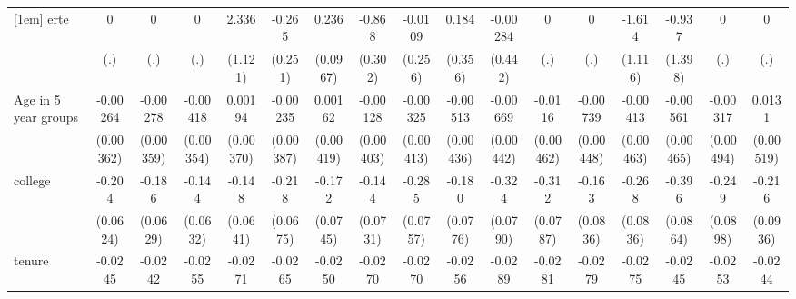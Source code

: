 {\begin{tabular}{l*{16}{c}}
[1em]
erte                &           0         &           0         &           0         &       2.336\sym{*}  &      -0.265         &       0.236\sym{*}  &      -0.868\sym{**} &     -0.0109         &       0.184         &    -0.00284         &           0         &           0         &      -1.614         &      -0.937         &           0         &           0         \\
                    &         (.)         &         (.)         &         (.)         &     (1.121)         &     (0.251)         &    (0.0967)         &     (0.302)         &     (0.256)         &     (0.356)         &     (0.442)         &         (.)         &         (.)         &     (1.116)         &     (1.398)         &         (.)         &         (.)         \\
[1em]
Age in 5 year groups&    -0.00264         &    -0.00278         &    -0.00418         &     0.00194         &    -0.00235         &     0.00162         &    -0.00128         &    -0.00325         &    -0.00513         &    -0.00669         &     -0.0116\sym{*}  &    -0.00739         &    -0.00413         &    -0.00561         &    -0.00317         &      0.0131\sym{*}  \\
                    &   (0.00362)         &   (0.00359)         &   (0.00354)         &   (0.00370)         &   (0.00387)         &   (0.00419)         &   (0.00403)         &   (0.00413)         &   (0.00436)         &   (0.00442)         &   (0.00462)         &   (0.00448)         &   (0.00463)         &   (0.00465)         &   (0.00494)         &   (0.00519)         \\
[1em]
college             &      -0.204\sym{**} &      -0.186\sym{**} &      -0.144\sym{*}  &      -0.148\sym{*}  &      -0.218\sym{**} &      -0.172\sym{*}  &      -0.144\sym{*}  &      -0.285\sym{***}&      -0.180\sym{*}  &      -0.324\sym{***}&      -0.312\sym{***}&      -0.163         &      -0.268\sym{**} &      -0.396\sym{***}&      -0.249\sym{**} &      -0.216\sym{*}  \\
                    &    (0.0624)         &    (0.0629)         &    (0.0632)         &    (0.0641)         &    (0.0675)         &    (0.0745)         &    (0.0731)         &    (0.0757)         &    (0.0776)         &    (0.0790)         &    (0.0787)         &    (0.0836)         &    (0.0836)         &    (0.0864)         &    (0.0898)         &    (0.0936)         \\
[1em]
tenure              &     -0.0245\sym{***}&     -0.0242\sym{***}&     -0.0255\sym{***}&     -0.0271\sym{***}&     -0.0265\sym{***}&     -0.0250\sym{***}&     -0.0270\sym{***}&     -0.0270\sym{***}&     -0.0256\sym{***}&     -0.0289\sym{***}&     -0.0281\sym{***}&     -0.0279\sym{***}&     -0.0275\sym{***}&     -0.0245\sym{***}&     -0.0253\sym{***}&     -0.0244\sym{***}\\

\end{tabular}}
